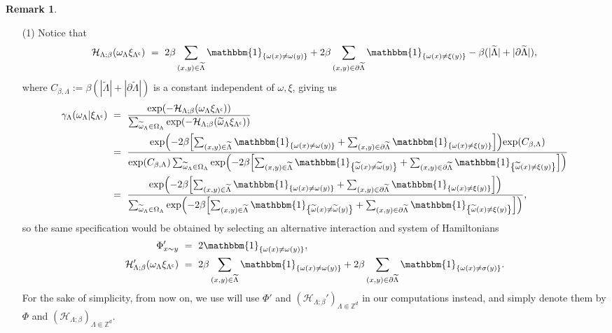 \documentclass[12pt]{article}
\renewcommand{\H}{\mathcal{H}}
\newcommand{\Z}{\mathbb{Z}}
\newcommand{\set}[1]{\left\{#1\right\}}
\newcommand{\oklepaj}[1]{\left(#1\right)}
\newcommand{\oglati}[1]{\left[#1\right]}
\newcommand{\1}{\mathbbm{1}}
\renewcommand{\c}{\mathsf{c}}
\newcommand{\5}{\vspace{0.5cm}}
\renewcommand{\tilde}{\widetilde}
\theoremstyle{definition}
\newtheorem{rem}[thm]{Remark}
\begin{document}
\begin{rem}\label{HamiltEquiv}
\begin{itemize}
	\item[(1)] Notice that $$\H_{\Lambda;\beta}(\omega_{\Lambda}\xi_{\Lambda^\c}) ~=~ 2\beta\sum_{(x,y)\in\tilde{\Lambda}}\1_{\set{\omega(x)\neq\omega(y)}} + 2\beta\sum_{(x,y)\in\partial\tilde{\Lambda}}\1_{\set{\omega(x)\neq\xi(y)}}-\beta(|\tilde{\Lambda}|+|\partial\tilde{\Lambda}|),$$
	where $C_{\beta,\Lambda}:=\beta(|\tilde{\Lambda}|+|\partial\tilde{\Lambda}|)$ is a  constant independent of $\omega,\xi$, giving us
	\begin{align*}
	\gamma_{\Lambda}(\omega_{\Lambda}|\xi_{\Lambda^\c}) ~&=~ \frac{\exp(-\H_{\Lambda;\beta}(\omega_{\Lambda}\xi_{\Lambda^\c}))}{\sum_{\tilde{\omega}_{\Lambda}\in\Omega_{\Lambda}}\exp(-\H_{\Lambda;\beta}(\tilde{\omega}_{\Lambda}\xi_{\Lambda^\c}))} \\
	&=~ \frac{\exp\!\oklepaj{-2\beta\!\oglati{\sum_{(x,y)\in\tilde{\Lambda}}\1_{\set{\omega(x)\neq\omega(y)}} + \sum_{(x,y)\in\partial\tilde{\Lambda}}\1_{\set{\omega(x)\neq\xi(y)}}}}\!\exp(C_{\beta,\Lambda})}{\exp(C_{\beta,\Lambda})\sum_{\tilde{\omega}_{\Lambda}\in\Omega_{\Lambda}}\exp\!\oklepaj{-2\beta\!\oglati{\sum_{(x,y)\in\tilde{\Lambda}}\1_{\set{\tilde{\omega}(x)\neq\tilde{\omega}(y)}} + \sum_{(x,y)\in\partial\tilde{\Lambda}}\1_{\set{\tilde{\omega}(x)\neq\xi(y)}}}}} \\
	&=~ \frac{\exp\!\oklepaj{-2\beta\!\oglati{\sum_{(x,y)\in\tilde{\Lambda}}\1_{\set{\omega(x)\neq\omega(y)}} + \sum_{(x,y)\in\partial\tilde{\Lambda}}\1_{\set{\omega(x)\neq\xi(y)}}}}}{\sum_{\tilde{\omega}_{\Lambda}\in\Omega_{\Lambda}}\exp\!\oklepaj{-2\beta\!\oglati{\sum_{(x,y)\in\tilde{\Lambda}}\1_{\set{\tilde{\omega}(x)\neq\tilde{\omega}(y)}} + \sum_{(x,y)\in\partial\tilde{\Lambda}}\1_{\set{\tilde{\omega}(x)\neq\xi(y)}}}}},
	\end{align*}
	so the same specification would be obtained by selecting an alternative interaction and system of Hamiltonians
	\begin{align*}
	\Phi_{x\sim y}' ~&=~ 2\1_{\set{\omega(x)\neq\omega(y)}}, \\
	\H_{\Lambda;\beta}'(\omega_{\Lambda}\xi_{\Lambda^\c}) ~&=~ 2\beta\sum_{(x,y)\in\tilde{\Lambda}}\1_{\set{\omega(x)\neq\omega(y)}}+2\beta\sum_{(x,y)\in\partial\tilde{\Lambda}}\1_{\set{\omega(x)\neq\sigma(y)}}.
	\end{align*}
	For the sake of simplicity, from now on, we use will use $\Phi'$ and $(\H_{\Lambda;\beta}')_{\Lambda\Subset\Z^d}$ in our computations instead, and simply denote them by $\Phi$ and $(\H_{\Lambda;\beta})_{\Lambda\Subset\Z^d}$.

\end{itemize}
\end{rem}
\end{document}
